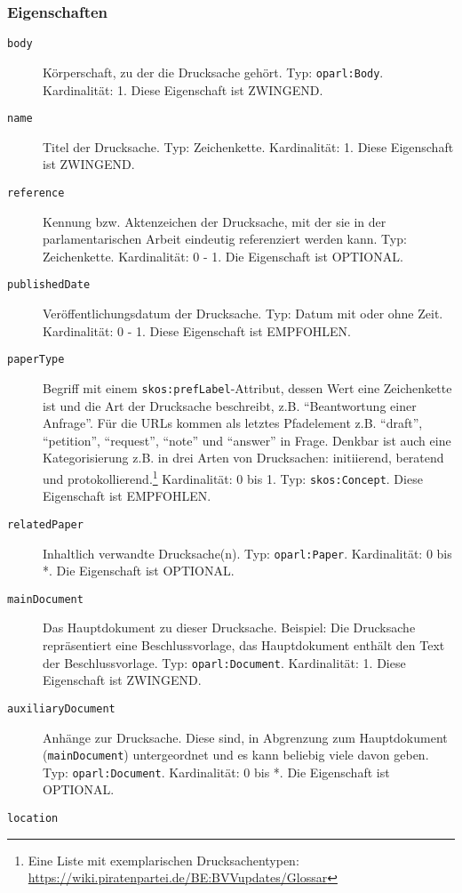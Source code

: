 \documentclass[,a4paper]{article}
\begin{document}
\subsubsection{Eigenschaften}\label{eigenschaften-6}

\begin{description}
\item[\texttt{body}]
Körperschaft, zu der die Drucksache gehört. Typ: \texttt{oparl:Body}.
Kardinalität: 1. Diese Eigenschaft ist ZWINGEND.
\item[\texttt{name}]
Titel der Drucksache. Typ: Zeichenkette. Kardinalität: 1. Diese
Eigenschaft ist ZWINGEND.
\item[\texttt{reference}]
Kennung bzw. Aktenzeichen der Drucksache, mit der sie in der
parlamentarischen Arbeit eindeutig referenziert werden kann. Typ:
Zeichenkette. Kardinalität: 0 - 1. Die Eigenschaft ist OPTIONAL.
\item[\texttt{publishedDate}]
Veröffentlichungsdatum der Drucksache. Typ: Datum mit oder ohne Zeit.
Kardinalität: 0 - 1. Diese Eigenschaft ist EMPFOHLEN.
\item[\texttt{paperType}]
Begriff mit einem \texttt{skos:prefLabel}-Attribut, dessen Wert eine
Zeichenkette ist und die Art der Drucksache beschreibt, z.B.
``Beantwortung einer Anfrage''. Für die URLs kommen als letztes
Pfadelement z.B. ``draft'', ``petition'', ``request'', ``note'' und
``answer'' in Frage. Denkbar ist auch eine Kategorisierung z.B. in drei
Arten von Drucksachen: initiierend, beratend und
protokollierend.\footnote{Eine Liste mit exemplarischen
  Drucksachentypen:
  \url{https://wiki.piratenpartei.de/BE:BVVupdates/Glossar}}
Kardinalität: 0 bis 1. Typ: \texttt{skos:Concept}. Diese Eigenschaft ist
EMPFOHLEN.
\item[\texttt{relatedPaper}]
Inhaltlich verwandte Drucksache(n). Typ: \texttt{oparl:Paper}.
Kardinalität: 0 bis *. Die Eigenschaft ist OPTIONAL.
\item[\texttt{mainDocument}]
Das Hauptdokument zu dieser Drucksache. Beispiel: Die Drucksache
repräsentiert eine Beschlussvorlage, das Hauptdokument enthält den Text
der Beschlussvorlage. Typ: \texttt{oparl:Document}. Kardinalität: 1.
Diese Eigenschaft ist ZWINGEND.
\item[\texttt{auxiliaryDocument}]
Anhänge zur Drucksache. Diese sind, in Abgrenzung zum Hauptdokument
(\texttt{mainDocument}) untergeordnet und es kann beliebig viele davon
geben. Typ: \texttt{oparl:Document}. Kardinalität: 0 bis *. Die
Eigenschaft ist OPTIONAL.
\item[\texttt{location}]

\end{description}
\end{document}
